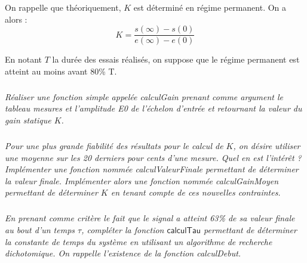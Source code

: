 \documentclass[10pt]{article}
\newif\ifprof
\begin{document}
On rappelle que théoriquement, $K$ est déterminé en régime permanent. On a alors : 
$$
K = \dfrac{s(\infty)-s(0)}{e(\infty)-e(0)}
$$

En notant $T$ la durée des essais réalisés, on suppose que le régime permanent est atteint au moins avant 80\% T.

\fi


\subparagraph{}
\textit{Réaliser une fonction simple appelée \textsl{calculGain} prenant comme argument le tableau \textsl{mesures} et l'amplitude \textsf{E0} de l'échelon d'entrée et retournant la valeur du gain statique $K$.}

\ifprof
\begin{corrige}
\begin{python}
def calculGain(mesures,E0):
    gain = (mesures[len(mesures)-1]-mesures[0])/E0
    return gain
\end{python}
\end{corrige}
\else
\fi

\subparagraph{}
\textit{Pour une plus grande fiabilité des résultats pour le calcul de $K$, on désire utiliser une moyenne sur les 20 derniers pour cents d'une mesure. Quel en est l'intérêt ? Implémenter une fonction nommée \textsl{calculValeurFinale} permettant de déterminer la valeur finale. Implémenter alors une fonction nommée  \textsl{calculGainMoyen} permettant de déterminer $K$ en tenant compte de ces nouvelles contraintes.}


\ifprof
\begin{corrige}
\begin{py}
\begin{python}
def calculValeurFinale(mesures):
    i0 = int(len(mesures)*80/100)
    moyenne=0
    for i in range(i0,len(mesures)):
        moyenne = moyenne+mesures[i]
    moyenne = moyenne/(len(mesures)-i0)
    return moyenne
    
def calculGainMoyen(mesures,E0):
    gain = calculValeurFinale(mesures)/E0
    return gain
\end{python}
\end{py}
\end{corrige}
\else
\fi


\subparagraph{}
\textit{En prenant comme critère le fait que le signal a atteint 63\% de sa valeur finale au bout d'un temps $\tau$, compléter la fonction $\textsf{calculTau}$ permettant de déterminer la constante de temps du système en utilisant un algorithme de recherche dichotomique. On rappelle l'existence de la fonction \textsf{calculDebut}.}
\end{document}
